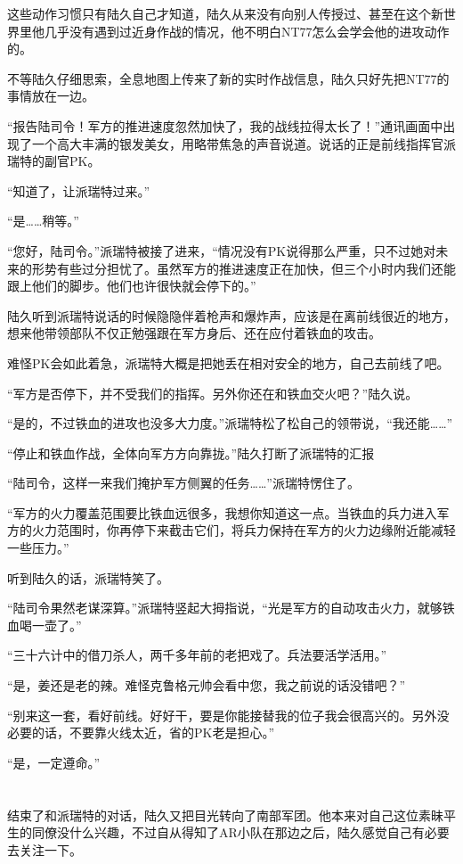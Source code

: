 这些动作习惯只有陆久自己才知道，陆久从来没有向别人传授过、甚至在这个新世界里他几乎没有遇到过近身作战的情况，他不明白NT77怎么会学会他的进攻动作的。

不等陆久仔细思索，全息地图上传来了新的实时作战信息，陆久只好先把NT77的事情放在一边。

“报告陆司令！军方的推进速度忽然加快了，我的战线拉得太长了！”通讯画面中出现了一个高大丰满的银发美女，用略带焦急的声音说道。说话的正是前线指挥官派瑞特的副官PK。

“知道了，让派瑞特过来。”

“是……稍等。”

“您好，陆司令。”派瑞特被接了进来，“情况没有PK说得那么严重，只不过她对未来的形势有些过分担忧了。虽然军方的推进速度正在加快，但三个小时内我们还能跟上他们的脚步。他们也许很快就会停下的。”

陆久听到派瑞特说话的时候隐隐伴着枪声和爆炸声，应该是在离前线很近的地方，想来他带领部队不仅正勉强跟在军方身后、还在应付着铁血的攻击。

难怪PK会如此着急，派瑞特大概是把她丢在相对安全的地方，自己去前线了吧。

“军方是否停下，并不受我们的指挥。另外你还在和铁血交火吧？”陆久说。

“是的，不过铁血的进攻也没多大力度。”派瑞特松了松自己的领带说，“我还能……”

“停止和铁血作战，全体向军方方向靠拢。”陆久打断了派瑞特的汇报

“陆司令，这样一来我们掩护军方侧翼的任务……”派瑞特愣住了。

“军方的火力覆盖范围要比铁血远很多，我想你知道这一点。当铁血的兵力进入军方的火力范围时，你再停下来截击它们，将兵力保持在军方的火力边缘附近能减轻一些压力。”

听到陆久的话，派瑞特笑了。

“陆司令果然老谋深算。”派瑞特竖起大拇指说，“光是军方的自动攻击火力，就够铁血喝一壶了。”

“三十六计中的借刀杀人，两千多年前的老把戏了。兵法要活学活用。”

“是，姜还是老的辣。难怪克鲁格元帅会看中您，我之前说的话没错吧？”

“别来这一套，看好前线。好好干，要是你能接替我的位子我会很高兴的。另外没必要的话，不要靠火线太近，省的PK老是担心。”

“是，一定遵命。”

\section*{}

结束了和派瑞特的对话，陆久又把目光转向了南部军团。他本来对自己这位素昧平生的同僚没什么兴趣，不过自从得知了AR小队在那边之后，陆久感觉自己有必要去关注一下。

